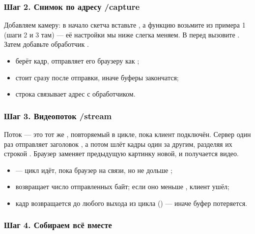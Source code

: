 \subsubsection{Шаг 2. Снимок по адресу /capture}

Добавляем камеру: в начало скетча вставьте , а функцию 
возьмите из примера 1 (шаги 2 и 3 там) --- её настройки мы ниже слегка меняем. В  перед
 вызовите . Затем добавьте обработчик .


\begin{itemize}[leftmargin=*]
  \item {} берёт кадр,  отправляет его браузеру как ;
  \item {} стоит сразу после отправки, иначе буферы закончатся;
  \item строка  связывает адрес с обработчиком.
\end{itemize}

\subsubsection{Шаг 3. Видеопоток /stream}

Поток --- это тот же , повторяемый в цикле, пока клиент подключён. Сервер один раз отправляет
заголовок , а потом шлёт кадры один за другим, разделяя их строкой
. Браузер заменяет предыдущую картинку новой, и получается видео.


\begin{itemize}[leftmargin=*]
  \item {} --- цикл идёт, пока браузер на связи, но не дольше ;
  \item {} возвращает число отправленных байт; если оно меньше , клиент ушёл;
  \item кадр возвращается до любого выхода из цикла () --- иначе буфер потеряется.
\end{itemize}

\subsubsection{Шаг 4. Собираем всё вместе}

